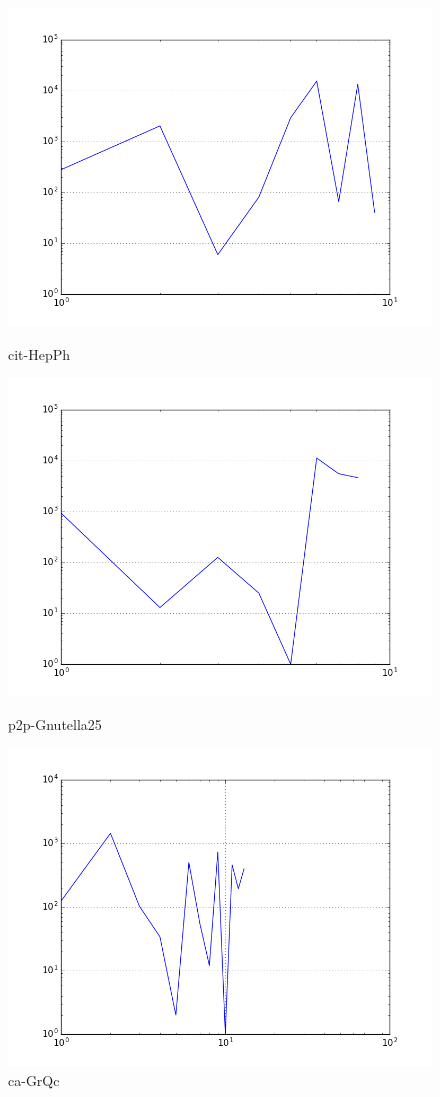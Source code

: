 \begin{figure}[H]
  \includegraphics[width=\linewidth]{img/cit-HepPh/radius_dist.png}
  \caption*{cit-HepPh}
\endminipage\hfill
{}
  \includegraphics[width=\linewidth]{img/p2p-Gnutella25/radius_dist.png}
  \caption*{p2p-Gnutella25}
\endminipage\hfill
{}
  \includegraphics[width=\linewidth]{img/ca-GrQc/radius_dist.png}
  \caption*{ca-GrQc}
\endminipage
\end{figure}
